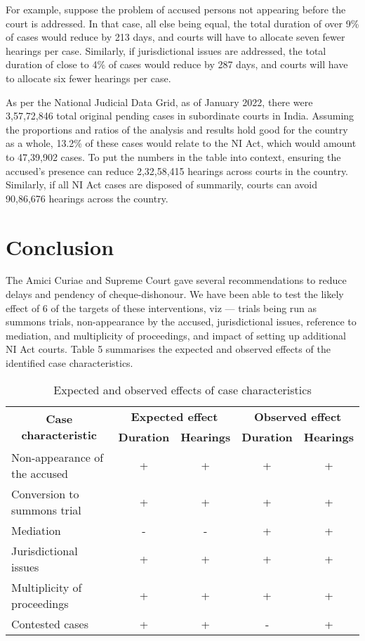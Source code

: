 \documentclass[12pt,a4paper]{article}
\begin{document}
For example, suppose the problem of accused persons not appearing before the court is addressed. In that case, all else being equal, the total duration of over 9\% of cases would reduce by 213 days, and courts will have to allocate seven fewer hearings per case. Similarly, if jurisdictional issues are addressed, the total duration of close to 4\% of cases would reduce by 287 days, and courts will have to allocate six fewer hearings per case.

As per the National Judicial Data Grid, as of January 2022, there were 3,57,72,846 total original pending cases in subordinate courts in India. Assuming the proportions and ratios of the analysis and results hold good for the country as a whole, 13.2\% of these cases would relate to the NI Act, which would amount to 47,39,902 cases. To put the numbers in the table into context, ensuring the accused’s presence can reduce 2,32,58,415 hearings across courts in the country. Similarly, if all NI Act cases are disposed of summarily, courts can avoid 90,86,676 hearings across the country.

\section{Conclusion}

The Amici Curiae and Supreme Court gave several recommendations to reduce delays and pendency of cheque-dishonour. We have been able to test the likely effect of 6 of the targets of these interventions, viz — trials being run as summons trials, non-appearance by the accused, jurisdictional issues, reference to mediation, and multiplicity of proceedings, and impact of setting up additional NI Act courts. Table 5 summarises the expected and observed effects of the identified case characteristics.

\begin{longtable}{@{}lcc|cc@{}}
\caption{Expected and observed effects of case characteristics}
\label{tab:observed}\\
\toprule
\multicolumn{1}{c}{\multirow{2}{*}{\textbf{Case characteristic}}} & \multicolumn{2}{c}{\textbf{Expected effect}} & \multicolumn{2}{c}{\textbf{Observed effect}} \\ \cmidrule(l){2-5}
\multicolumn{1}{c}{} & \textbf{Duration} & \textbf{Hearings} & \textbf{Duration} & \textbf{Hearings}\\ \midrule
Non-appearance of the accused & + & + & + & + \\
Conversion to summons trial & + & + & + & +\\
Mediation & - & - & + & + \\
Jurisdictional issues & + & + & + & + \\
Multiplicity of proceedings & + & + & + & +\\
Contested cases & + & + & - & +\\ \bottomrule
\end{longtable}
\end{document}
